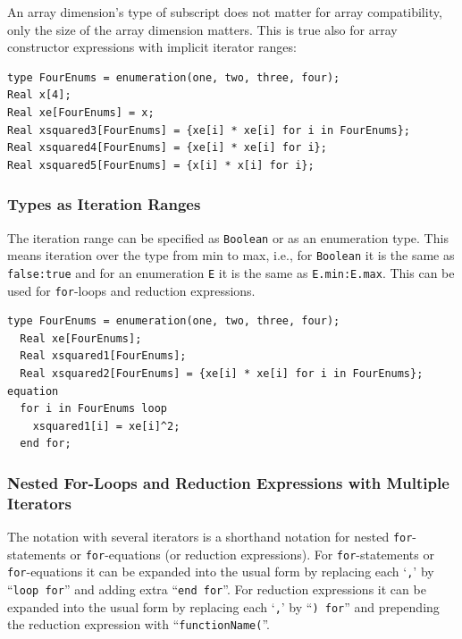 \begin{example}
An array dimension's type of subscript does not matter for array compatibility, only the size of the array dimension matters.
This is true also for array constructor expressions with implicit iterator ranges:
\begin{lstlisting}[language=modelica]
type FourEnums = enumeration(one, two, three, four);
Real x[4];
Real xe[FourEnums] = x;
Real xsquared3[FourEnums] = {xe[i] * xe[i] for i in FourEnums};
Real xsquared4[FourEnums] = {xe[i] * xe[i] for i};
Real xsquared5[FourEnums] = {x[i] * x[i] for i};
\end{lstlisting}
\end{example}


\subsubsection{Types as Iteration Ranges}\label{types-as-iteration-ranges}

The iteration range can be specified as \lstinline!Boolean! or as an enumeration type.
This means iteration over the type from min to max, i.e., for \lstinline!Boolean! it is the same as \lstinline!false:true! and for an enumeration \lstinline!E! it is the same as \lstinline!E.min:E.max!.
This can be used for \lstinline!for!-loops and reduction expressions.

\begin{example}
\begin{lstlisting}[language=modelica]
  type FourEnums = enumeration(one, two, three, four);
  Real xe[FourEnums];
  Real xsquared1[FourEnums];
  Real xsquared2[FourEnums] = {xe[i] * xe[i] for i in FourEnums};
equation
  for i in FourEnums loop
    xsquared1[i] = xe[i]^2;
  end for;
\end{lstlisting}
\end{example}


\subsubsection{Nested For-Loops and Reduction Expressions with Multiple Iterators}\label{nested-for-loops-and-reduction-expressions-with-multiple-iterators}

The notation with several iterators is a shorthand notation for nested \lstinline!for!-statements or \lstinline!for!-equations (or reduction expressions).
For \lstinline!for!-statements or \lstinline!for!-equations it can be expanded into the usual form by replacing each `\lstinline!,!' by ``\lstinline!loop for!'' and adding extra ``\lstinline!end for!''.
For reduction expressions it can be expanded into the usual form by replacing each `\lstinline!,!' by ``\lstinline!) for!'' and prepending the reduction expression with ``\lstinline!functionName(!''.

